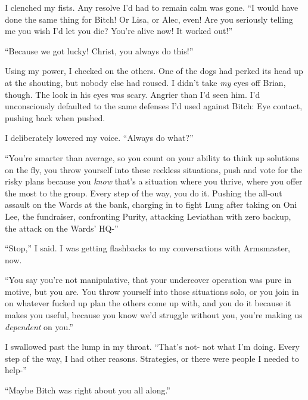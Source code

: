 I clenched my fists.  Any resolve I'd had to remain calm was gone.  ``I would have done the same thing for Bitch!  Or Lisa, or Alec, even!  Are you seriously telling me you wish I'd let you die?  You're alive now!  It worked out!''



``Because we got lucky!  Christ, you always do this!''



Using my power, I checked on the others.  One of the dogs had perked its head up at the shouting, but nobody else had roused.  I didn't take \emph{my} eyes off Brian, though.  The look in his eyes was scary.  Angrier than I'd seen him.  I'd unconsciously defaulted to the same defenses I'd used against Bitch: Eye contact, pushing back when pushed.



I deliberately lowered my voice.  ``Always do what?''



``You're smarter than average, so you count on your ability to think up solutions on the fly, you throw yourself into these reckless situations, push and vote for the risky plans because you \emph{know} that's a situation where you thrive, where you offer the most to the group.  Every step of the way, you do it.  Pushing the all-out assault on the Wards at the bank, charging in to fight Lung after taking on Oni Lee, the fundraiser, confronting Purity, attacking Leviathan with zero backup, the attack on the Wards' HQ-''



``Stop,'' I said.  I was getting flashbacks to my conversations with Armsmaster, now.



``You say you're not manipulative, that your undercover operation was pure in motive, but you are.  You throw yourself into those situations solo, or you join in on whatever fucked up plan the others come up with, and you do it because it makes you useful, because you know we'd struggle without you, you're making us \emph{dependent} on you.''



I swallowed past the lump in my throat.  ``That's not- not what I'm doing.  Every step of the way, I had other reasons.  Strategies, or there were people I needed to help-''



``Maybe Bitch was right about you all along.''



